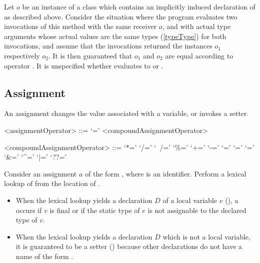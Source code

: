\documentclass[makeidx]{article}
\begin{document}
{{\LMHash{}%
Let $o$ be an instance of a class which contains
an implicitly induced declaration of \gmiName{}
as described above.
%
Consider the situation where the program evaluates
two invocations of this method with the same receiver $o$,
and with actual type arguments whose actual values are
the same types (\ref{typeType})  for both invocations,
and assume that the invocations returned
the instances $o_1$ respectively $o_2$.
%
It is then guaranteed that $o_1$ and $o_2$ are equal
according to operator \lit{==}.
It is unspecified whether
evaluates to \TRUE{} or \FALSE.

} %



\subsection{Assignment}

\LMHash{}%
An assignment changes the value associated with a variable,
or invokes a setter.

\begin{grammar}
<assignmentOperator> ::= `='
  \alt <compoundAssignmentOperator>

<compoundAssignmentOperator> ::= `*='
  \alt `/='
  \alt `~/='
  \alt `\%='
  \alt `+='
  \alt `-='
  \alt `\ltlt='
  \alt `\gtgtgt='
  \alt `\gtgt='
  \alt `\&='
  \alt `^='
  \alt `|='
  \alt `??='
\end{grammar}

\LMHash{}%
Consider an assignment $a$ of the form ,
where \id{} is an identifier.
Perform a lexical lookup of \code{\id=} from the location of \id.

\begin{itemize}
\item
  When the lexical lookup yields a declaration $D$ of a local variable $v$
  (),
  a  occurs if $v$ is final
  or if the static type of $e$ is not assignable to the declared type of $v$.
\item
  When the lexical lookup yields a declaration $D$
  which is not a local variable,
  it is guaranteed to be a setter
  ()
  because other declarations do not have a name
  of the form \code{\id=}.


\end{itemize}}
\end{document}
